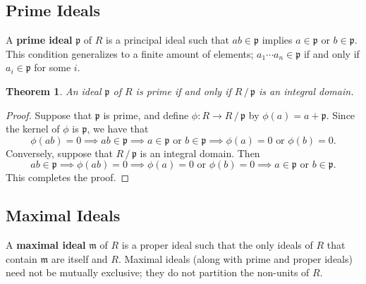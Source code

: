 \documentclass[11pt]{article}
\newtheorem{theorem}{Theorem}
\begin{document}

\subsection{Prime Ideals}

A \textbf{prime ideal} $\mathfrak{p}$ of $R$ is a principal ideal such that $ab \in \mathfrak{p}$ implies $a \in \mathfrak{p}$ or $b \in \mathfrak{p}$. This condition generalizes to a finite amount of elements; $a_{1} \cdots a_{n} \in \mathfrak{p}$ if and only if $a_{i} \in \mathfrak{p}$ for some $i$.

\begin{adjustwidth}{0.5cm}{}
	\begin{theorem}
		An ideal $\mathfrak{p}$ of $R$ is prime if and only if $R \,/\, \mathfrak{p}$ is an integral domain.
	\end{theorem}
	\begin{proof}
		Suppose that $\mathfrak{p}$ is prime, and define $\phi : R \to R \,/\, \mathfrak{p}$ by $\phi(a) = a + \mathfrak{p}$. Since the kernel of $\phi$ is $\mathfrak{p}$, we have that
		\[
			\phi(ab) = 0 \implies ab \in \mathfrak{p} \implies a \in \mathfrak{p} \text{ or } b \in \mathfrak{p} \implies \phi(a) = 0 \text{ or } \phi(b) = 0.
		\]
		Conversely, suppose that $R \,/\, \mathfrak{p}$ is an integral domain. Then
		\[
			ab \in \mathfrak{p} \implies \phi(ab) = 0 \implies \phi(a) = 0 \text{ or } \phi(b) = 0 \implies a \in \mathfrak{p} \text{ or } b \in \mathfrak{p}.
		\]
		This completes the proof.
	\end{proof}
\end{adjustwidth}


\subsection{Maximal Ideals}

A \textbf{maximal ideal} $\mathfrak{m}$ of $R$ is a proper ideal such that the only ideals of $R$ that contain $\mathfrak{m}$ are itself and $R$. Maximal ideals (along with prime and proper ideals) need not be mutually exclusive; they do not partition the non-units of $R$.
\end{document}
